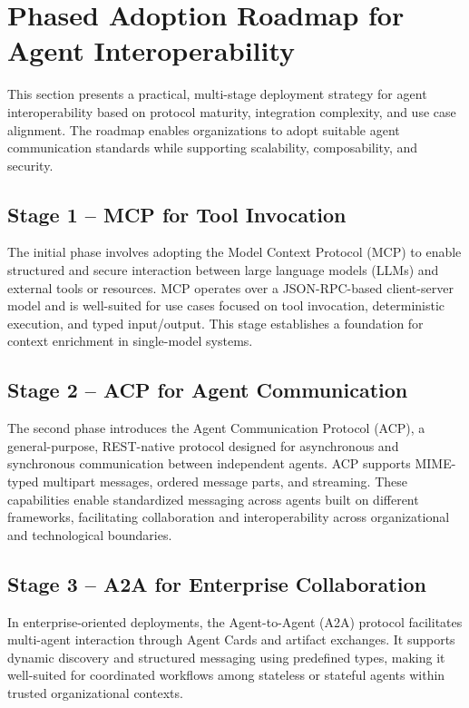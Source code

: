 \documentclass{article}
\begin{document}
\section{Phased Adoption Roadmap for Agent Interoperability}

This section presents a practical, multi-stage deployment strategy for agent interoperability based on protocol maturity, integration complexity, and use case alignment. The roadmap enables organizations to adopt suitable agent communication standards while supporting scalability, composability, and security.

\subsection{Stage 1 – MCP for Tool Invocation}
The initial phase involves adopting the Model Context Protocol (MCP) to enable structured and secure interaction between large language models (LLMs) and external tools or resources. MCP operates over a JSON-RPC-based client-server model and is well-suited for use cases focused on tool invocation, deterministic execution, and typed input/output. This stage establishes a foundation for context enrichment in single-model systems.

\subsection{Stage 2 – ACP for Agent Communication}
The second phase introduces the Agent Communication Protocol (ACP), a general-purpose, REST-native protocol designed for asynchronous and synchronous communication between independent agents. ACP supports MIME-typed multipart messages, ordered message parts, and streaming. These capabilities enable standardized messaging across agents built on different frameworks, facilitating collaboration and interoperability across organizational and technological boundaries.

\subsection{Stage 3 – A2A for Enterprise Collaboration}
In enterprise-oriented deployments, the Agent-to-Agent (A2A) protocol facilitates multi-agent interaction through Agent Cards and artifact exchanges. It supports dynamic discovery and structured messaging using predefined types, making it well-suited for coordinated workflows among stateless or stateful agents within trusted organizational contexts.
\end{document}
